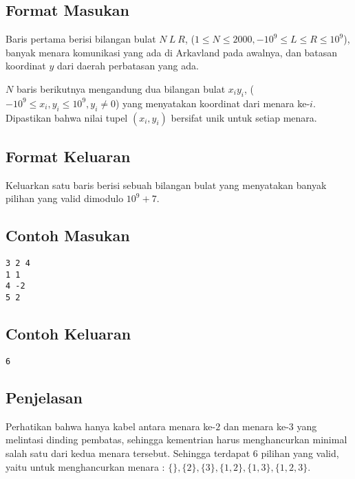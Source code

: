 \documentclass{article}
\begin{document}
\subsection*{Format Masukan}
Baris pertama berisi bilangan bulat $N\:L\:R$, ($1 \leq N \leq 2000, -10^9 \leq L \leq R \leq 10^9$), banyak menara komunikasi yang ada di Arkavland pada awalnya, dan batasan koordinat $y$ dari daerah perbatasan yang ada.

$N$ baris berikutnya mengandung dua bilangan bulat $x_i y_i$, ($-10^9 \leq x_i, y_i \leq 10^9, y_i \ne 0$) yang menyatakan koordinat dari menara ke-$i$. Dipastikan bahwa nilai tupel $(x_i, y_i)$ bersifat unik untuk setiap menara.

\subsection*{Format Keluaran}
Keluarkan satu baris berisi sebuah bilangan bulat yang menyatakan banyak pilihan yang valid dimodulo $10^9 + 7$.
\\

\begin{multicols}{2}
\subsection*{Contoh Masukan}
\begin{lstlisting}
3 2 4
1 1
4 -2
5 2

\end{lstlisting}
\columnbreak
\subsection*{Contoh Keluaran}
\begin{lstlisting}
6
\end{lstlisting}
\vfill
\null
\end{multicols}

\subsection*{Penjelasan}
Perhatikan bahwa hanya kabel antara menara ke-$2$ dan menara ke-$3$ yang melintasi dinding pembatas, sehingga kementrian harus menghancurkan minimal salah satu dari kedua menara tersebut. Sehingga terdapat $6$ pilihan yang valid, yaitu untuk menghancurkan menara : $\{\}, \{2\}, \{3\}, \{1,2\}, \{1,3\}, \{1,2,3\}$.
\pagebreak
\end{document}
